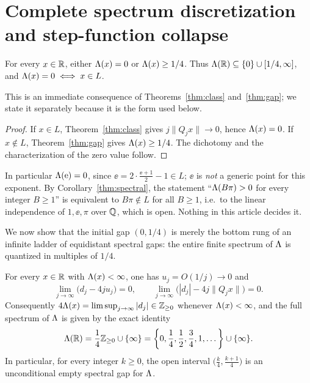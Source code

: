 \section{Complete spectrum discretization and step-function collapse}\label{sec:spectrum}

\begin{corollary}\label{thm:spectral}
For every $x\in\mathbb{R}$, either $\Lambda(x)=0$ or $\Lambda(x)\ge1/4$. Thus
$\Lambda(\mathbb{R})\subseteq\{0\}\cup[1/4,\infty]$, and $\Lambda(x)=0\iff x\in L$.
\end{corollary}

This is an immediate consequence of Theorems~\ref{thm:class}
and~\ref{thm:gap}; we state it separately because it is the form used
below.

\begin{proof}
If $x\in L$, Theorem~\ref{thm:class} gives $j\|Q_jx\|\to0$, hence $\Lambda(x)=0$.
If $x\notin L$, Theorem~\ref{thm:gap} gives $\Lambda(x)\ge1/4$. The dichotomy and
the characterization of the zero value follow.
\end{proof}

\begin{remark}\label{rem:linear-indep}
In particular $\Lambda(\mathrm{e})=0$, since $\ee=2\cdot\frac{\ee+1}{2}-1\in L$; $\ee$ is
\emph{not} a generic point for this exponent. By Corollary~\ref{thm:spectral}, the statement
``$\Lambda(B\pi)>0$ for every integer $B\ge1$'' is equivalent to
$B\pi\notin L$ for all $B\ge1$, i.e.\ to the linear independence of
$1,\ee,\pi$ over $\mathbb{Q}$, which is open. Nothing in this article decides it.
\end{remark}

We now show that the initial gap $(0,1/4)$ is merely the bottom rung of an
infinite ladder of equidistant spectral gaps: the entire finite spectrum of
$\Lambda$ is quantized in multiples of $1/4$.

\begin{theorem}\label{thm:full-spectrum}
For every $x\in\mathbb{R}$ with $\Lambda(x)<\infty$, one has $u_j=O(1/j)\to0$ and
\begin{equation}\label{eq:digit-asymp}
\lim_{j\to\infty}\bigl(d_j-4ju_j\bigr)=0,\qquad
\lim_{j\to\infty}\bigl(|d_j|-4j\|Q_jx\|\bigr)=0.
\end{equation}
Consequently $4\Lambda(x)=\limsup_{j\to\infty}|d_j|\in\mathbb{Z}_{\ge0}$ whenever
$\Lambda(x)<\infty$, and the full spectrum of $\Lambda$ is given by the exact identity
\begin{equation}\label{eq:full-spectrum}
\Lambda(\mathbb{R})=\frac14\mathbb{Z}_{\ge0}\cup\{\infty\}
=\left\{0,\frac14,\frac12,\frac34,1,\dots\right\}\cup\{\infty\}.
\end{equation}
In particular, for every integer $k\ge0$, the open interval
$\bigl(\frac{k}{4},\frac{k+1}{4}\bigr)$ is an unconditional empty spectral gap
for $\Lambda$.
\end{theorem}

